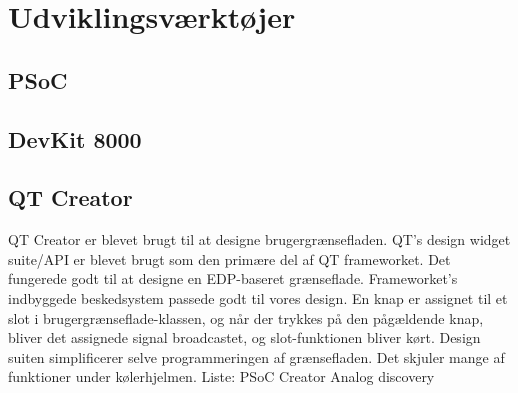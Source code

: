 \chapter{Udviklingsværktøjer}

\section{PSoC}

\section{DevKit 8000}

\section{QT Creator}
QT Creator er blevet brugt til at designe brugergrænsefladen.
QT's design widget suite/API er blevet brugt som den primære del af QT frameworket. Det fungerede godt til at designe en EDP-baseret grænseflade. Frameworket's indbyggede beskedsystem passede godt til vores design.
En knap er assignet til et slot i brugergrænseflade-klassen, og når der trykkes på den pågældende knap, bliver det assignede signal broadcastet, og slot-funktionen bliver kørt.
Design suiten simplificerer selve programmeringen af grænsefladen. Det skjuler mange af funktioner under kølerhjelmen.
Liste:
PSoC Creator
Analog discovery
